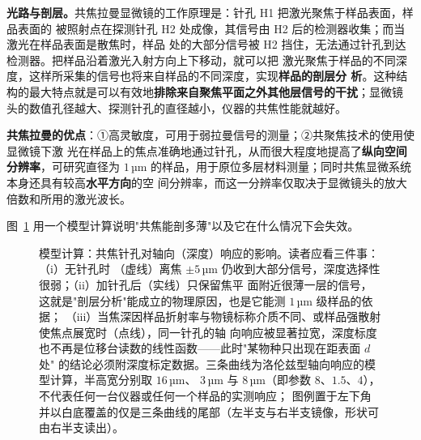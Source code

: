 \textbf{光路与剖层。}共焦拉曼显微镜的工作原理是：针孔 H1 把激光聚焦于样品表面，样品表面的
被照射点在探测针孔 H2 处成像，其信号由 H2 后的检测器收集；而当激光在样品表面是散焦时，样品
处的大部分信号被 H2 挡住，无法通过针孔到达检测器。把样品沿着激光入射方向上下移动，就可以把
激光聚焦于样品的不同深度，这样所采集的信号也将来自样品的不同深度，实现\textbf{样品的剖层分
析}。这种结构的最大特点就是可以有效地\textbf{排除来自聚焦平面之外其他层信号的干扰}；显微镜
头的数值孔径越大、探测针孔的直径越小，仪器的共焦性能就越好。

\textbf{共焦拉曼的优点}：①高灵敏度，可用于弱拉曼信号的测量；②共聚焦技术的使用使显微镜下激
光在样品上的焦点准确地通过针孔，从而很大程度地提高了\textbf{纵向空间分辨率}，可研究直径为
$1\,$µm 的样品，用于原位多层材料测量；同时共焦显微系统本身还具有较高\textbf{水平方向}的空
间分辨率，而这一分辨率仅取决于显微镜头的放大倍数和所用的激光波长。

图~\ref{fig:confocal-axial} 用一个模型计算说明"共焦能剖多薄"以及它在什么情况下会失效。

\begin{figure}[tbp]
\centering
{}
\caption{模型计算：共焦针孔对轴向（深度）响应的影响\modelmark。读者应看三件事：（i）无针孔时
（虚线）离焦 $\pm5\,$µm 仍收到大部分信号，深度选择性很弱；（ii）加针孔后（实线）只保留焦平
面附近很薄一层的信号，这就是"剖层分析"能成立的物理原因，也是它能测 $1\,$µm 级样品的依据；
（iii）当焦深因样品折射率与物镜标称介质不同、或样品强散射使焦点展宽时（点线），同一针孔的轴
向响应被显著拉宽，深度标度也不再是位移台读数的线性函数——此时"某物种只出现在距表面 $d$ 处"
的结论必须附深度标定数据。三条曲线为洛伦兹型轴向响应的模型计算，半高宽分别取 $16\,$µm、
$3\,$µm 与 $8\,$µm（即参数 $8$、$1.5$、$4$），不代表任何一台仪器或任何一个样品的实测响应；
图例置于左下角并以白底覆盖的仅是三条曲线的尾部（左半支与右半支镜像，形状可由右半支读出）。
}
\label{fig:confocal-axial}
\end{figure}

